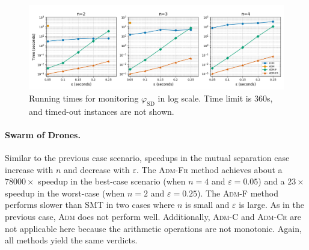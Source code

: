 \begin{figure}[t]
	\begin{center}
		\includegraphics[width=\linewidth]{ms_newnames.png}
		\caption{Running times for monitoring $\varphi_{\text{SD}}$ in log scale. Time limit is 360s, and timed-out instances are not shown.}
	\end{center}
\end{figure}

\paragraph*{Swarm of Drones.}
Similar to the previous case scenario, speedups in the mutual separation case increase with \(n\) and decrease with \(\varepsilon\).
The \textsc{Adm-Fr} method achieves about a $78000\times$ speedup in the best-case scenario (when \(n=4\) and \(\varepsilon=0.05\)) and a $23\times$ speedup in the worst-case (when \(n=2\) and \(\varepsilon=0.25\)).
The \textsc{Adm-F} method performs slower than SMT in two cases where \(n\) is small and \(\varepsilon\) is large.
%
As in the previous case, \textsc{Adm} does not perform well.
Additionally, \textsc{Adm-C} and \textsc{Adm-Cr} are not applicable here because the arithmetic operations are not monotonic.
Again, all methods yield the same verdicts.

